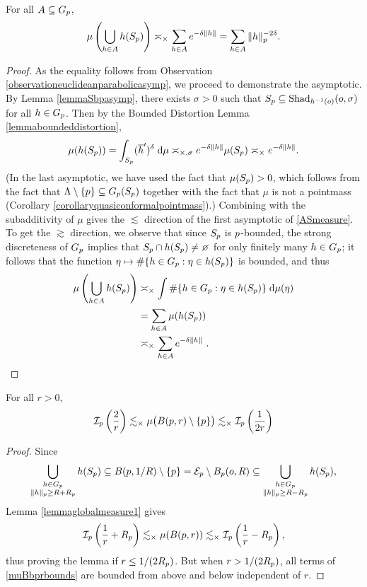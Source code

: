 \begin{lemma}
\label{lemmaglobalmeasure1}
For all $A\subseteq G_p$,
\begin{equation}
\label{ASmeasure}
\mu\left(\bigcup_{h\in A}h(S_p)\right) \asymp_\times \sum_{h\in A} e^{-\delta\|h\|} = \sum_{h\in A} \|h\|_p^{-2\delta}.
\end{equation}
\end{lemma}
\begin{proof}
As the equality follows from Observation \ref{observationeuclideanparabolicasymp}, we proceed to demonstrate the asymptotic. By Lemma \ref{lemmaSbpasymp}, there exists $\sigma > 0$ such that $S_p \subseteq \operatorname{Shad}_{h^{-1}(o)}(o,\sigma)$ for all $h\in G_p$. Then by the Bounded Distortion Lemma \ref{lemmaboundeddistortion},
\[
\mu(h(S_p)) = \int_{S_p} (\overline h')^\delta \;\mathrm{d} \mu \asymp_{\times,\sigma} e^{-\delta\|h\|} \mu(S_p) \asymp_\times e^{-\delta\|h\|}.
\]
(In the last asymptotic, we have used the fact that $\mu(S_p) > 0$, which follows from the fact that $\Lambda\setminus\{p\} \subseteq G_p(S_p)$ together with the fact that $\mu$ is not a pointmass (Corollary \ref{corollaryquasiconformalpointmass}).) Combining with the subadditivity of $\mu$ gives the $\lesssim$ direction of the first asymptotic of \eqref{ASmeasure}. To get the $\gtrsim$ direction, we observe that since $S_p$ is $p$-bounded, the strong discreteness of $G_p$ implies that $S_\bp\cap h(S_\bp)\neq\emptyset$ for only finitely many $h\in G_p$; it follows that the function $\eta\mapsto\#\{h\in G_p : \eta\in h(S_p)\}$ is bounded, and thus
\begin{align*}
\mu\left(\bigcup_{h\in A}h(S_p)\right) 
&\asymp_\times \int \#\{h\in G_p : \eta\in h(S_p)\} \;\mathrm{d}\mu(\eta)\\
&= \sum_{h\in A}\mu(h(S_p))\\
&\asymp_\times \sum_{h\in A} e^{-\delta\|h\|} ~.
\end{align*}
\end{proof}


\begin{corollary}
\label{corollaryglobalmeasure11}
For all $r > 0$,
\begin{equation}
\label{muBbprbounds}
\mathcal I_p\left(\frac2r\right) \lesssim_\times \mu\big(B(p,r)\setminus\{p\}\big) \lesssim_\times \mathcal I_p\left(\frac1{2r}\right)
\end{equation}
\end{corollary}
\begin{proof}
Since
\[
\bigcup_{\substack{h\in G_p \\ \|h\|_p \geq R + R_p}} h(S_p)
\subseteq B(p,1/R)\setminus\{p\} = \mathcal E_p \setminus B_p(o,R)
\subseteq \bigcup_{\substack{h\in G_p \\ \|h\|_p \geq R - R_p}} h(S_p),
\]
Lemma \ref{lemmaglobalmeasure1} gives
\[
\mathcal I_p\left(\frac1r + R_p\right) \lesssim_\times \mu(B(p,r)) \lesssim_\times \mathcal I_p\left(\frac1r - R_p\right),
\]
thus proving the lemma if $r \leq 1/(2R_p)$. But when $r > 1/(2 R_p)$, all terms of \eqref{muBbprbounds} are bounded from above and below independent of $r$.
\end{proof}

